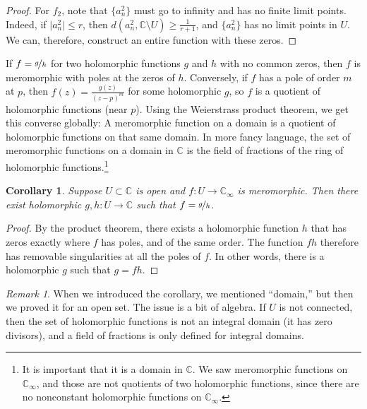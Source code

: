 \documentclass[12pt,openany]{book}
\newcommand{\sabs}[1]{\lvert {#1} \rvert}
\newcommand{\C}{{\mathbb{C}}}
\newcommand{\myquote}[1]{``#1''}
\theoremstyle{plain}
\newtheorem{cor}[thm]{Corollary}
\theoremstyle{remark}
\newtheorem{remark}[thm]{Remark}
\theoremstyle{definition}
\theoremstyle{exercise}
\theoremstyle{example}
\begin{document}
\begin{proof}
For $f_2$, note that $\{a^2_n\}$ must go to infinity and has no finite limit
points.  Indeed, if $\sabs{a^2_n} \leq r$, then $d(a^2_n,\C\setminus U)
\geq \frac{1}{r+1}$, and $\{ a^2_n \}$ has no limit points in
$U$.
We can, therefore, construct an entire function with
these zeros.
\end{proof}

If $f = \nicefrac{g}{h}$ for two holomorphic functions $g$ and $h$ with no
common zeros, then $f$
is meromorphic with poles at the zeros of $h$.  Conversely,
if $f$ has a pole of order $m$ at $p$, then $f(z) = \frac{g(z)}{{(z-p)}^m}$
for some holomorphic $g$, so $f$ is a quotient of holomorphic functions
(near $p$).
Using the Weierstrass product theorem, we get this converse globally:
A meromorphic function on a domain is a quotient of holomorphic functions on
that same domain.
In more fancy language, the set of meromorphic functions on a
domain in $\C$ is the field of fractions of the ring of holomorphic
functions.\footnote{It is important that it is a
domain in $\C$.  We saw meromorphic functions on $\C_\infty$,
and those are not quotients of two holomorphic functions, since there are
no nonconstant holomorphic functions on $\C_\infty$.}

\begin{cor}
Suppose $U \subset \C$ is open and $f \colon U \to \C_{\infty}$ is
meromorphic.  Then there exist holomorphic $g,h \colon U \to \C$ such that
$f = \nicefrac{g}{h}$.
\end{cor}

\begin{proof}
By the product theorem, there exists a holomorphic function $h$ that has
zeros exactly where $f$ has poles, and of the same order.  The function $fh$
therefore has removable singularities at all the poles of $f$.  In other
words, there is a holomorphic $g$ such that $g=fh$.
\end{proof}

\begin{remark}
When we introduced the corollary, we mentioned \myquote{domain,} but then we proved it
for an open set.  The issue is a bit of algebra.  If $U$ is not connected,
then the set of holomorphic functions is not an integral domain (it has zero
divisors), and a field of fractions is only defined for integral domains.
\end{remark}
\end{document}
